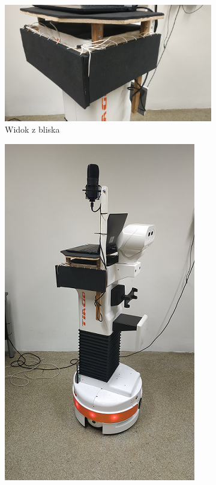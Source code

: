 \begin{figure}
  \begin{subfigure}[t]{0.65\linewidth}
    \centering
    \includegraphics[width=0.9\linewidth]{img/czujnik_mocowanie_1.jpg} 
    \caption{Widok z bliska} 
  \end{subfigure}%
  \begin{subfigure}[t]{0.35\linewidth}
    \centering
    \includegraphics[width=0.9\linewidth]{img/czujnik_mocowanie_2.png}

\end{subfigure}
\end{figure}
